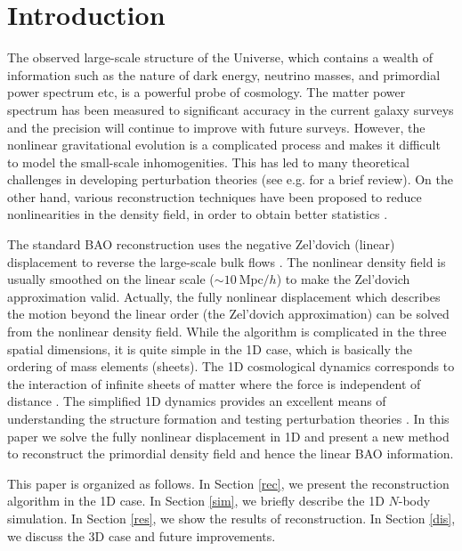 \documentclass[aps,prd,twocolumn,showpacs,superscriptaddress,groupedaddress,nofootinbib]{revtex4}  %
\newcommand{\mr}{\mathrm}
\begin{document}

\section{Introduction}
The observed large-scale structure of the Universe, which contains a wealth of 
information such as the nature of dark energy, neutrino masses, and primordial
power spectrum etc, is a powerful probe of cosmology.
The matter power spectrum has been measured to significant accuracy in the 
current galaxy surveys and the precision will continue to improve with future 
surveys. 
However, the nonlinear gravitational evolution is a complicated process and 
makes it difficult to model the small-scale inhomogenities. This has led to
many theoretical challenges in developing perturbation theories 
(see e.g. \cite{2016matt} for a brief review).
On the other hand, various reconstruction techniques have been proposed to 
reduce nonlinearities in the density field, in order to obtain better statistics
\cite{2007bao,2015PhRvD..92l3522S}. 
 
The standard BAO reconstruction uses the negative
Zel'dovich (linear) displacement to reverse the large-scale bulk flows 
\cite{2007bao}. 
The nonlinear density field is usually smoothed on the linear scale 
($\sim10\ \mr{Mpc}/h$) to make the Zel'dovich approximation valid.
Actually, the fully nonlinear displacement which describes the motion beyond
the linear order (the Zel'dovich approximation) can be solved from the nonlinear
density field. 
While the algorithm is complicated in the three spatial dimensions, it is quite simple in the 1D case, which is basically the ordering of mass elements 
(sheets).
The 1D cosmological dynamics corresponds to the interaction of infinite sheets
of matter where the force is independent of distance \cite{2016matt}.
The simplified 1D dynamics provides an excellent means of understanding the 
structure formation and testing perturbation theories \cite{2016matt}.
In this paper we solve the fully nonlinear displacement in 1D and present
a new method to reconstruct the primordial density field and hence the linear 
BAO information.

This paper is organized as follows. 
In Section \ref{rec}, we present the reconstruction algorithm in the 1D case. 
In Section \ref{sim}, we briefly describe the 1D $N$-body simulation. 
In Section \ref{res}, we show the results of reconstruction.
In Section \ref{dis}, we discuss the 3D case and future improvements.
\end{document}
